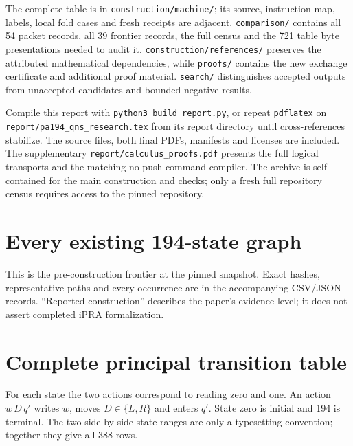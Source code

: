 \documentclass[11pt,letterpaper]{article}
\newcommand{\file}[1]{\nolinkurl{#1}}
\begin{document}
The complete table is in \file{construction/machine/}; its source,
instruction map, labels, local fold cases and fresh receipts are adjacent.
\file{comparison/} contains all 54 packet records, all 39 frontier records,
the full census and the 721 table byte presentations needed to audit it.
\file{construction/references/} preserves the attributed mathematical
dependencies, while \file{proofs/} contains the new exchange certificate and
additional proof material. \file{search/} distinguishes accepted outputs
from unaccepted candidates and bounded negative results.

Compile this report with \file{python3 build_report.py}, or repeat
\file{pdflatex} on \file{report/pa194_qns_research.tex} from its report
directory until cross-references stabilize. The source files, both final PDFs, manifests and licenses are included.
The supplementary \file{report/calculus_proofs.pdf} presents the full
logical transports and the matching no-push command compiler.
The archive is self-contained for the main construction and checks; only a
fresh full repository census requires access to the pinned repository.

\appendix
\clearpage
\section{Every existing 194-state graph}
\label{app:frontier}
This is the pre-construction frontier at the pinned snapshot. Exact hashes,
representative paths and every occurrence are in the accompanying CSV/JSON
records. ``Reported construction'' describes the paper's evidence level;
it does not assert completed iPRA formalization.
\begingroup\small

\endgroup

\clearpage
\section{Complete principal transition table}
\label{app:table}
For each state the two actions correspond to reading zero and one. An
action $w\,D\,q'$ writes $w$, moves $D\in\{L,R\}$ and enters $q'$.
State zero is initial and 194 is terminal. The two side-by-side state
ranges are only a typesetting convention; together they give all 388 rows.

\end{document}
